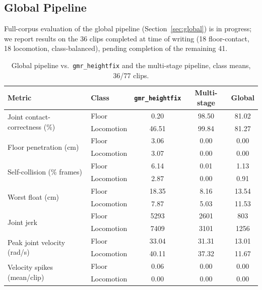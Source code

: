 \subsection{Global Pipeline}
\label{sec:results-global}

Full-corpus evaluation of the global pipeline (Section~\ref{sec:global}) is
in progress; we report results on the 36 clips completed at time of writing
(18 floor-contact, 18 locomotion, class-balanced), pending completion of the
remaining 41.

\begin{table}[t]
\centering
\caption{Global pipeline vs.\ \texttt{gmr\_heightfix} and the multi-stage
pipeline, class means, 36/77 clips.}
\label{tab:global}
\begin{tabular}{llccc}
\toprule
Metric & Class & \texttt{gmr\_heightfix} & Multi-stage & Global \\
\midrule
\multirow{2}{*}{Joint contact-correctness (\%)}
  & Floor      & 0.20  & 98.50 & 81.02 \\
  & Locomotion & 46.51 & 99.84 & 81.27 \\
\multirow{2}{*}{Floor penetration (cm)}
  & Floor      & 3.06  & 0.00  & 0.00  \\
  & Locomotion & 3.07  & 0.00  & 0.00  \\
\multirow{2}{*}{Self-collision (\% frames)}
  & Floor      & 6.14  & 0.01  & 1.13  \\
  & Locomotion & 2.87  & 0.00  & 0.91  \\
\multirow{2}{*}{Worst float (cm)}
  & Floor      & 18.35 & 8.16  & 13.54 \\
  & Locomotion & 7.87  & 5.03  & 11.53 \\
\multirow{2}{*}{Joint jerk}
  & Floor      & 5293  & 2601  & 803   \\
  & Locomotion & 7409  & 3101  & 1256  \\
\multirow{2}{*}{Peak joint velocity (rad/s)}
  & Floor      & 33.04 & 31.31 & 13.01 \\
  & Locomotion & 40.11 & 37.32 & 11.67 \\
\multirow{2}{*}{Velocity spikes (mean/clip)}
  & Floor      & 0.06  & 0.00  & 0.00  \\
  & Locomotion & 0.00  & 0.00  & 0.00  \\
\bottomrule
\end{tabular}
\end{table}

